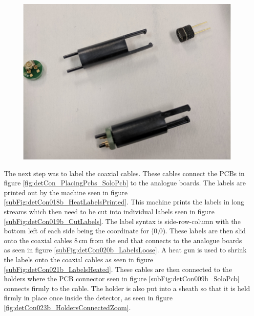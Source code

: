 \begin{figure}[!h]
\centering
\includegraphics[width=0.7\linewidth]{Chapter3/Figs/Raster/detCon017b_HoldersWithParts.png}
\label{fig:detCon017b_HoldersWithParts}
\end{figure}

The next step was to label the coaxial cables. These cables connect the PCBs in figure \ref{fig:detCon_PlacingPcbs_SoloPcb} to the analogue boards. The labels are printed out by the machine seen in figure  \ref{subFig:detCon018b_HeatLabelsPrinted}. This machine prints the labels in long streams which then need to be cut into individual labels seen in figure \ref{subFig:detCon019b_CutLabels}. The label syntax is side-row-column with the bottom left of each side being the coordinate for (0,0). These labels are then slid onto the coaxial cables 8\,cm from the end that connects to the analogue boards as seen in figure \ref{subFig:detCon020b_LabelsLoose}. A heat gun is used to shrink the labels onto the coaxial cables as seen in figure \ref{subFig:detCon021b_LabelsHeated}. These cables are then connected to the holders where the PCB connector seen in figure \ref{subFig:detCon009b_SoloPcb} connects firmly to the cable. The holder is also put into a sheath so that it is held firmly in place once inside the detector, as seen in figure \ref{fig:detCon023b_HoldersConnectedZoom}.

